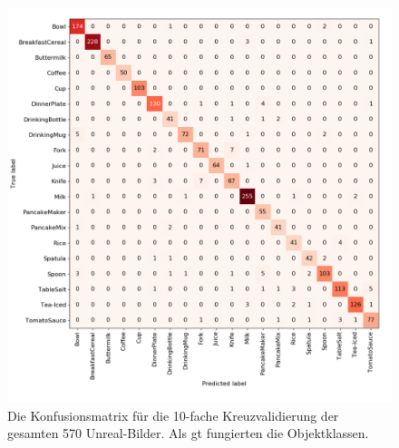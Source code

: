 \begin{figure}
\centering
	\includegraphics[scale=.3]{img/chapter6/UnrealGTClass.png}
\caption[Konfusionsmatrix des gesamten Unreal-Bilder Datensatzes mit Objektklassen als GT]{Die Konfusionsmatrix für die 10-fache Kreuzvalidierung der gesamten 570 Unreal-Bilder. Als \gls{gt} fungierten die Objektklassen.}
\label{fig:UnrealGTClass_confMatrix}
\end{figure}

